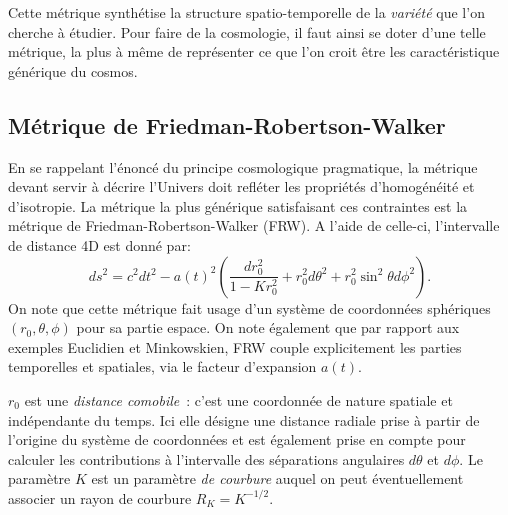 Cette métrique synthétise la structure spatio-temporelle de la \textit{variété} que l'on cherche à étudier. Pour faire de la cosmologie, il faut ainsi se doter d'une telle métrique, la plus à même de représenter ce que l'on croit être les caractéristique générique du cosmos.

\subsection{Métrique de Friedman-Robertson-Walker}
En se rappelant l'énoncé du principe cosmologique pragmatique, la métrique devant servir à décrire l'Univers doit refléter les propriétés d'homogénéité et d'isotropie. La métrique la plus générique satisfaisant ces contraintes est la métrique de Friedman-Robertson-Walker (FRW). A l'aide de celle-ci, l'intervalle de distance 4D est donné par:
\begin{equation}
ds^2=c^2dt^2-a(t)^2(\frac{dr_0^2}{1-Kr_0^2}+r_0^2d\theta^2+r_0^2\sin^2\theta d\phi^2).
\label{e:FRW}
\end{equation}
On note que cette métrique fait usage d'un système de coordonnées sphériques $(r_0,\theta,\phi)$ pour sa partie espace. On note également que par rapport aux exemples Euclidien et Minkowskien, FRW couple explicitement les parties temporelles et spatiales, via le facteur d'expansion $a(t)$.  

$r_0$ est une \textit{distance comobile}~: c'est une coordonnée de nature spatiale et indépendante du temps. Ici elle désigne une distance radiale prise à partir de l'origine du système de coordonnées et est également prise en compte pour calculer les contributions à l'intervalle des séparations angulaires $d\theta$ et $d\phi$. Le paramètre $K$ est un paramètre \textit{de courbure} auquel on peut éventuellement associer un rayon de courbure $R_K=K^{-1/2}$.


